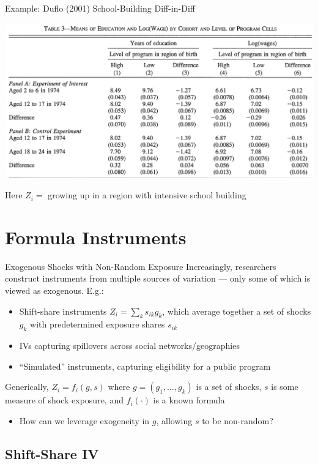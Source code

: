 \documentclass{beamer}
\begin{document}
\begin{frame}{Example: Duflo (2001) School-Building Diff-in-Diff}
\begin{center}
	\includegraphics[width=1\textwidth]{./lecture_includes/duflo_2001.png}
\end{center}
Here $Z_i=$ growing up in a region with intensive school building
\end{frame}
\section{Formula Instruments}

\begin{frame}{Exogenous Shocks with Non-Random Exposure}
Increasingly, researchers construct instruments from multiple sources of variation --- only some of which is viewed as exogenous. E.g.:
\begin{itemize}
\item Shift-share instruments $Z_i=\sum_k s_{ik}g_k$, which average together a set of shocks $g_k$ with predetermined exposure shares $s_{ik}$
\item IVs capturing spillovers across social networks/geographies 
\item ``Simulated'' instruments, capturing eligibility for a public program
\end{itemize}\medskip\pause{}

Generically, $Z_i=f_i(g,s)$ where $g=(g_1,\dots,g_k)$ is a set of shocks, $s$ is some measure of shock exposure, and $f_i(\cdot)$ is a known formula
\begin{itemize}
\item How can we leverage exogeneity in $g$, allowing $s$ to be non-random?
\end{itemize}

\end{frame}

\subsection{Shift-Share IV}
\end{document}
